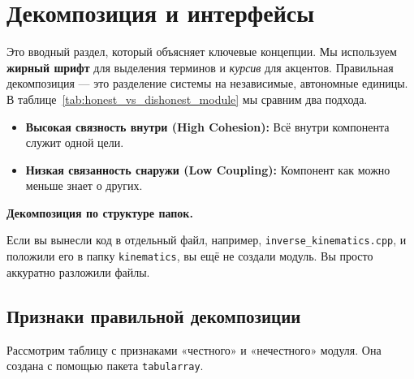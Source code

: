 

\maketitle
\tableofcontents
\newpage

\section{Декомпозиция и интерфейсы}
\label{sec:decomposition}

Это вводный раздел, который объясняет ключевые концепции. Мы используем \textbf{жирный шрифт} для выделения терминов и \textit{курсив} для акцентов. Правильная декомпозиция — это разделение системы на независимые, автономные единицы. В таблице~\ref{tab:honest_vs_dishonest_module} мы сравним два подхода.

\begin{itemize}
    \item \textbf{Высокая связность внутри (High Cohesion):} Всё внутри компонента служит одной цели.
    \item \textbf{Низкая связанность снаружи (Low Coupling):} Компонент как можно меньше знает о других.
\end{itemize}

\begin{box_danger}
    \textbf{Декомпозиция по структуре папок.}
    
    Если вы вынесли код в отдельный файл, например, \texttt{inverse\_kinematics.cpp}, и положили его в папку \texttt{kinematics}, вы ещё не создали модуль. Вы просто аккуратно разложили файлы.
\end{box_danger}


\subsection{Признаки правильной декомпозиции}
\label{subsec:decomposition_signs}

Рассмотрим таблицу с признаками «честного» и «нечестного» модуля. Она создана с помощью пакета \texttt{tabularray}.

